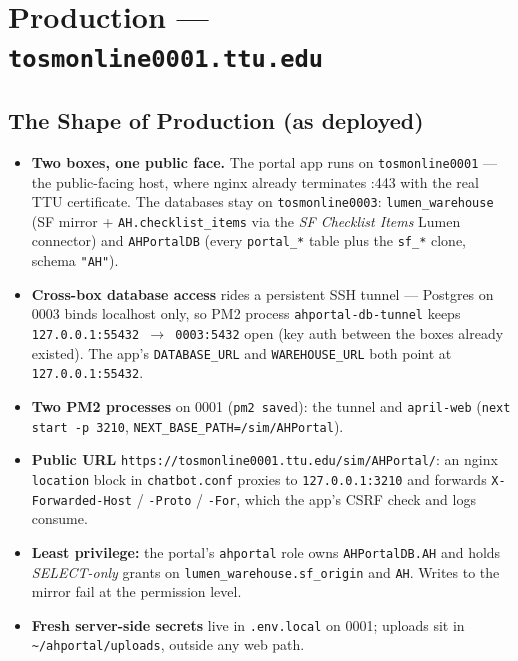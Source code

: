 \documentclass[11pt,letterpaper]{report}
\begin{document}
\chapter{Production --- \texttt{tosmonline0001.ttu.edu}}

\section{The Shape of Production (as deployed)}

\begin{itemize}[leftmargin=1.4em]
  \item \textbf{Two boxes, one public face.} The portal app runs on
        \texttt{tosmonline0001} --- the public-facing host, where nginx already
        terminates :443 with the real TTU certificate. The databases stay on
        \texttt{tosmonline0003}: \texttt{lumen\_warehouse} (SF mirror +
        \texttt{AH.checklist\_items} via the \emph{SF Checklist Items} Lumen
        connector) and \texttt{AHPortalDB} (every \texttt{portal\_*} table plus
        the \texttt{sf\_*} clone, schema \texttt{"AH"}).
  \item \textbf{Cross-box database access} rides a persistent SSH tunnel ---
        Postgres on 0003 binds localhost only, so PM2 process
        \texttt{ahportal-db-tunnel} keeps
        \texttt{127.0.0.1:55432 $\rightarrow$ 0003:5432} open (key auth between
        the boxes already existed). The app's \texttt{DATABASE\_URL} and
        \texttt{WAREHOUSE\_URL} both point at \texttt{127.0.0.1:55432}.
  \item \textbf{Two PM2 processes} on 0001 (\texttt{pm2 save}d): the tunnel and
        \texttt{april-web} (\texttt{next start -p 3210},
        \texttt{NEXT\_BASE\_PATH=/sim/AHPortal}).
  \item \textbf{Public URL} \texttt{https://tosmonline0001.ttu.edu/sim/AHPortal/}:
        an nginx \texttt{location} block in \texttt{chatbot.conf} proxies to
        \texttt{127.0.0.1:3210} and forwards \texttt{X-Forwarded-Host} /
        \texttt{-Proto} / \texttt{-For}, which the app's CSRF check and logs
        consume.
  \item \textbf{Least privilege:} the portal's \texttt{ahportal} role owns
        \texttt{AHPortalDB.AH} and holds \emph{SELECT-only} grants on
        \texttt{lumen\_warehouse.sf\_origin} and \texttt{AH}. Writes to the
        mirror fail at the permission level.
  \item \textbf{Fresh server-side secrets} live in \texttt{.env.local} on 0001;
        uploads sit in \texttt{\textasciitilde/ahportal/uploads}, outside any
        web path.
\end{itemize}
\end{document}
